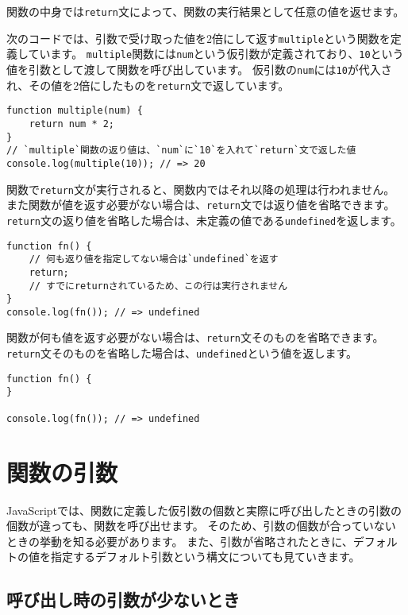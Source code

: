 関数の中身では\texttt{return}文によって、関数の実行結果として任意の値を返せます。

次のコードでは、引数で受け取った値を2倍にして返す\texttt{multiple}という関数を定義しています。
\texttt{multiple}関数には\texttt{num}という仮引数が定義されており、\texttt{10}という値を引数として渡して関数を呼び出しています。
仮引数の\texttt{num}には\texttt{10}が代入され、その値を2倍にしたものを\texttt{return}文で返しています。

\begin{lstlisting}
function multiple(num) {
    return num * 2;
}
// `multiple`関数の返り値は、`num`に`10`を入れて`return`文で返した値
console.log(multiple(10)); // => 20
\end{lstlisting}

関数で\texttt{return}文が実行されると、関数内ではそれ以降の処理は行われません。
また関数が値を返す必要がない場合は、\texttt{return}文では返り値を省略できます。
\texttt{return}文の返り値を省略した場合は、未定義の値である\texttt{undefined}を返します。

\begin{lstlisting}
function fn() {
    // 何も返り値を指定してない場合は`undefined`を返す
    return;
    // すでにreturnされているため、この行は実行されません
}
console.log(fn()); // => undefined
\end{lstlisting}

関数が何も値を返す必要がない場合は、\texttt{return}文そのものを省略できます。
\texttt{return}文そのものを省略した場合は、\texttt{undefined}という値を返します。

\begin{lstlisting}
function fn() {
}

console.log(fn()); // => undefined
\end{lstlisting}

\hypertarget{function-arguments}{%
\section{関数の引数}\label{function-arguments}}

JavaScriptでは、関数に定義した仮引数の個数と実際に呼び出したときの引数の個数が違っても、関数を呼び出せます。
そのため、引数の個数が合っていないときの挙動を知る必要があります。
また、引数が省略されたときに、デフォルトの値を指定するデフォルト引数という構文についても見ていきます。

\hypertarget{function-less-arguments}{%
\subsection{呼び出し時の引数が少ないとき}\label{function-less-arguments}}

